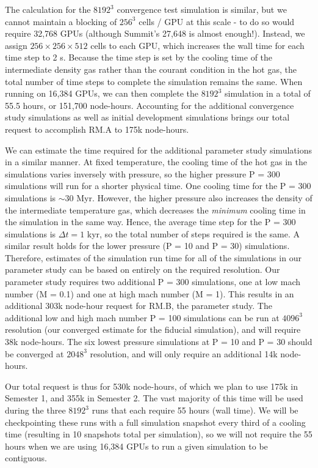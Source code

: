 \documentclass[11pt,letterpaper,english]{article}
\begin{document}
The calculation for the $8192^3$ convergence test simulation is similar, but we cannot maintain a blocking of $256^3$ cells / GPU at this scale - to do so would require 32,768 GPUs (although Summit's 27,648 is almost enough!). Instead, we assign $256\times256\times512$ cells to each GPU, which increases the wall time for each time step to 2 s. Because the time step is set by the cooling time of the intermediate density gas rather than the courant condition in the hot gas, the total number of time steps to complete the simulation remains the same. When running on 16,384 GPUs, we can then complete the $8192^3$ simulation in a total of 55.5 hours, or 151,700 node-hours. Accounting for the additional convergence study simulations as well as initial development simulations brings our total request to accomplish RM.A to 175k node-hours.

We can estimate the time required for the additional parameter study simulations in a similar manner. At fixed temperature, the cooling time of the hot gas in the simulations varies inversely with pressure, so the higher pressure P = 300 simulations will run for a shorter physical time. One cooling time for the P = 300 simulations is $\sim 30$ Myr. However, the higher pressure also increases the density of the intermediate temperature gas, which decreases the {\it minimum} cooling time in the simulation in the same way. Hence, the average time step for the P = 300 simulations is $\Delta t = 1$ kyr, so the total number of steps required is the same. A similar result holds for the lower pressure (P = 10 and P = 30) simulations. Therefore, estimates of the simulation run time for all of the simulations in our parameter study can be based on entirely on the required resolution. Our parameter study requires two additional P = 300 simulations, one at low mach number (M = 0.1) and one at high mach number (M = 1). This results in an additional 303k node-hour request for RM.B, the parameter study. The additional low and high mach number P = 100 simulations can be run at $4096^3$ resolution (our converged estimate for the fiducial simulation), and will require 38k node-hours. The six lowest pressure simulations at P = 10 and P = 30 should be converged at $2048^3$ resolution, and will only require an additional 14k node-hours.

Our total request is thus for 530k node-hours, of which we plan to use 175k in Semester 1, and 355k in Semester 2. The vast majority of this time will be used during the three $8192^3$ runs that each require 55 hours (wall time). We will be checkpointing these runs with a full simulation snapshot every third of a cooling time (resulting in 10 snapshots total per simulation), so we will not require the 55 hours when we are using 16,384 GPUs to run a given simulation to be contiguous.
\end{document}
